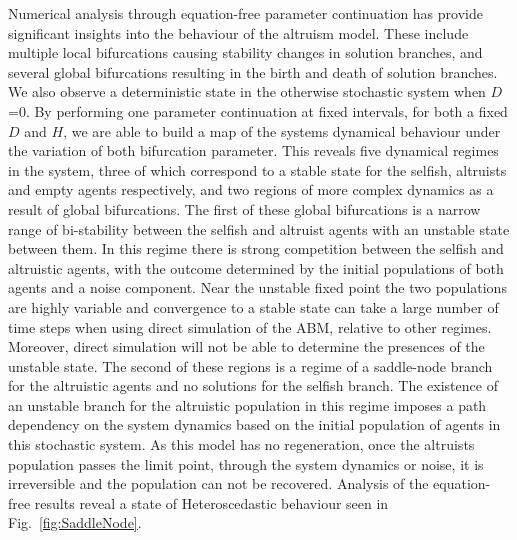 \documentclass[11pt]{article}
\begin{document}
Numerical analysis through equation-free parameter continuation has provide significant insights into the behaviour of the altruism model. These include multiple local bifurcations causing stability changes in solution branches, and several global bifurcations resulting in the birth and death of solution branches. We also observe a deterministic state in the otherwise stochastic system when $D$=0. By performing one parameter continuation at fixed intervals, for both a fixed $D$ and $H$, we are able to build a map of the systems dynamical behaviour under the variation of both bifurcation parameter. This reveals five dynamical regimes in the system, three of which correspond to a stable state for the selfish, altruists and empty agents respectively, and two regions of more complex dynamics as a result of global bifurcations. 
The first of these global bifurcations is a narrow range of bi-stability between the selfish and altruist agents with an unstable state between them. In this regime there is strong competition between the selfish and altruistic agents, with the outcome determined by the initial populations of both agents and a noise component. Near the unstable fixed point the two populations are highly variable and convergence to a stable state can take a large number of time steps when using direct simulation of the ABM, relative to other regimes. Moreover, direct simulation will not be able to determine the presences of the unstable state. 
The second of these regions is a regime of a saddle-node branch for the altruistic agents and no solutions for the selfish branch. The existence of an unstable branch for the altruistic population in this regime imposes a path dependency on the system dynamics based on the initial population of agents in this stochastic system. As this model has no regeneration, once the altruists population passes the limit point, through the system dynamics or noise, it is irreversible and the population can not be recovered. Analysis of the equation-free results reveal a state of Heteroscedastic behaviour seen in Fig.~\ref{fig:SaddleNode}.
\end{document}
